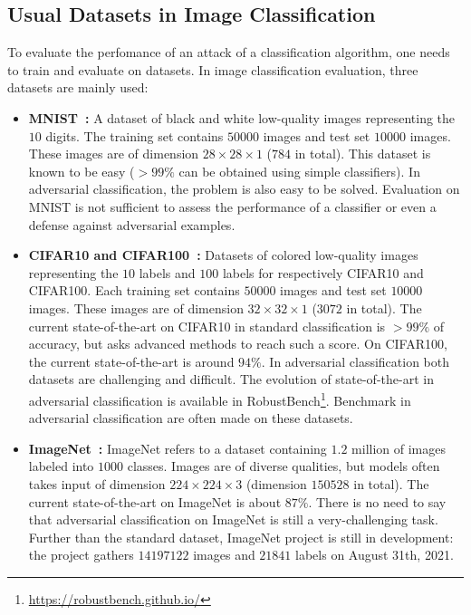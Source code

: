 \subsection{Usual Datasets in Image Classification}
To evaluate the perfomance of an attack of a classification algorithm, one needs to train and evaluate on datasets. In image classification evaluation, three datasets are mainly used:
\begin{itemize}
    \item \textbf{MNIST~\citep{lecun1998mnist}:} A dataset of black and white low-quality images representing the $10$ digits. The training set contains $50000$ images and test set $10000$ images. These images are of dimension $28\times28\times 1$ ($784$ in total). This dataset is known to be easy ($>99\%$ can be obtained using simple classifiers). In adversarial classification, the problem is also easy to be solved. Evaluation on MNIST is not sufficient to assess the performance of a classifier or even a defense against adversarial examples.
    \item \textbf{CIFAR10 and CIFAR100~\citep{krizhevsky2009learning}:} Datasets of colored low-quality images representing the $10$ labels and $100$ labels for respectively CIFAR10 and CIFAR100. Each training set contains $50000$ images and test set $10000$ images. These images are of dimension $32\times32\times 1$ ($3072$ in total). The current state-of-the-art on CIFAR10 in standard classification is $>99\%$ of accuracy, but asks advanced methods to reach such a score. On CIFAR100, the current state-of-the-art is around $94\%$. In adversarial classification both datasets are challenging and difficult. The evolution of state-of-the-art in adversarial classification is available in RobustBench\footnote{\url{https://robustbench.github.io/}}. Benchmark in adversarial classification are often made on these datasets.
    \item \textbf{ImageNet~\citep{imagenet_cvpr09}:} ImageNet refers to a dataset containing $1.2$ million of images labeled into $1000$ classes. Images are of diverse qualities, but models often takes input of dimension $224\times224\times 3$ (dimension $150528$ in total). The current state-of-the-art on ImageNet is about $87\%$. There is no need to say that adversarial classification on ImageNet is still a very-challenging task. Further than the standard dataset, ImageNet project is still in development: the project gathers $14197122$ images and $21841$ labels on August 31th, 2021.   


\end{itemize}


